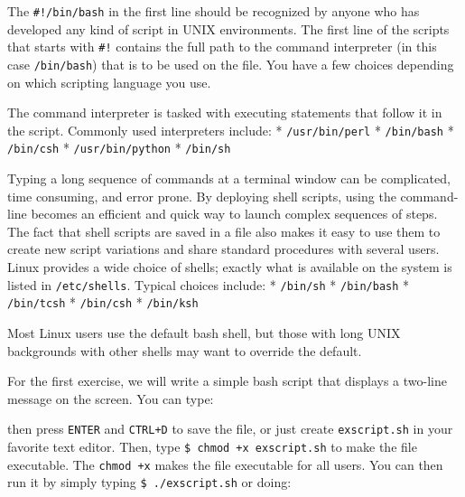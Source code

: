 The \texttt{\#!/bin/bash} in the first line should be recognized by
anyone who has developed any kind of script in UNIX environments. The
first line of the scripts that starts with \texttt{\#!} contains the
full path to the command interpreter (in this case \texttt{/bin/bash})
that is to be used on the file. You have a few choices depending on
which scripting language you use.

The command interpreter is tasked with executing statements that follow
it in the script. Commonly used interpreters include: *
\texttt{/usr/bin/perl} * \texttt{/bin/bash} * \texttt{/bin/csh} *
\texttt{/usr/bin/python} * \texttt{/bin/sh}

Typing a long sequence of commands at a terminal window can be
complicated, time consuming, and error prone. By deploying shell
scripts, using the command-line becomes an efficient and quick way to
launch complex sequences of steps. The fact that shell scripts are saved
in a file also makes it easy to use them to create new script variations
and share standard procedures with several users. Linux provides a wide
choice of shells; exactly what is available on the system is listed in
\texttt{/etc/shells}. Typical choices include: * \texttt{/bin/sh} *
\texttt{/bin/bash} * \texttt{/bin/tcsh} * \texttt{/bin/csh} *
\texttt{/bin/ksh}

Most Linux users use the default bash shell, but those with long UNIX
backgrounds with other shells may want to override the default.

For the first exercise, we will write a simple bash script that displays
a two-line message on the screen. You can type:

\begin{Shaded}
\begin{Highlighting}[]
\NormalTok{$ } \KeywordTok{>} 
 
 
\end{Highlighting}
\end{Shaded}

then press \texttt{ENTER} and \texttt{CTRL+D} to save the file, or just
create \texttt{exscript.sh} in your favorite text editor. Then, type
\texttt{\$ chmod +x exscript.sh} to make the file executable. The
\texttt{chmod +x} makes the file executable for all users. You can then
run it by simply typing \texttt{\$ ./exscript.sh} or doing:

\begin{Shaded}
\begin{Highlighting}[]
\NormalTok{$ } 
\end{Highlighting}
\end{Shaded}

